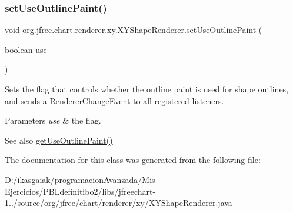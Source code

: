 \subsubsection{\texorpdfstring{set\+Use\+Outline\+Paint()}{setUseOutlinePaint()}}
{\footnotesize\ttfamily void org.\+jfree.\+chart.\+renderer.\+xy.\+X\+Y\+Shape\+Renderer.\+set\+Use\+Outline\+Paint (\begin{DoxyParamCaption}\item[{boolean}]{use }\end{DoxyParamCaption})}

Sets the flag that controls whether the outline paint is used for shape outlines, and sends a \mbox{\hyperlink{}{Renderer\+Change\+Event}} to all registered listeners.


\begin{DoxyParams}{Parameters}
{\em use} & the flag.\\
\hline
\end{DoxyParams}
\begin{DoxySeeAlso}{See also}
\mbox{\hyperlink{classorg_1_1jfree_1_1chart_1_1renderer_1_1xy_1_1_x_y_shape_renderer_ac0eba297f026e0ee631ae48054e0f103}{get\+Use\+Outline\+Paint()}} 
\end{DoxySeeAlso}


The documentation for this class was generated from the following file\+:\begin{DoxyCompactItemize}
\item 
D\+:/ikasgaiak/programacion\+Avanzada/\+Mis Ejercicios/\+P\+B\+Ldefinitibo2/libs/jfreechart-\/1../source/org/jfree/chart/renderer/xy/\mbox{\hyperlink{_x_y_shape_renderer_8java}{X\+Y\+Shape\+Renderer.\+java}}\end{DoxyCompactItemize}
